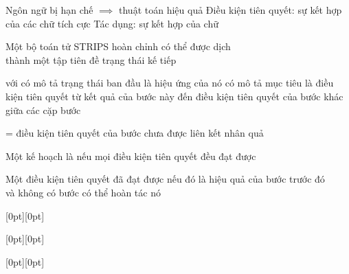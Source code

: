 \documentclass{article}
\begin{document}
\begin{huge}

Ngôn ngữ bị hạn chế $\implies$ thuật toán hiệu quả \nl
Điều kiện tiên quyết: sự kết hợp của các chữ tích cực\nl
Tác dụng: sự kết hợp của chữ

Một bộ toán tử STRIPS hoàn chỉnh có thể được dịch \\
thành một tập tiên đề trạng thái kế tiếp


 với\nl
   có mô tả trạng thái ban đầu là hiệu ứng của nó\nl
   có mô tả mục tiêu là điều kiện tiên quyết\nl
   từ kết quả của bước này đến điều kiện tiên quyết của bước khác\nl
   giữa các cặp bước

 = điều kiện tiên quyết của bước chưa được liên kết nhân quả

Một kế hoạch là  nếu mọi điều kiện tiên quyết đều đạt được

Một điều kiện tiên quyết đã đạt được \txb{} nếu đó là hiệu quả của bước trước đó\\
và không có bước  có thể hoàn tác nó




\vspace*{0.2in}

\centerline{\raisebox{-0.9\textheight}[0pt][0pt]{\textheight{}}}



\vspace*{0.2in}

\centerline{\raisebox{-0.9\textheight}[0pt][0pt]{\textheight{}}}



\vspace*{0.2in}

\centerline{\raisebox{-0.9\textheight}[0pt][0pt]{\textheight{}}}





\end{huge}
\end{document}
